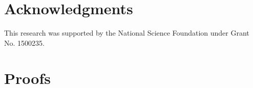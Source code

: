 \draftsecskip



\section*{Acknowledgments}
This research was supported by the National Science 
Foundation under Grant No. 1500235.





\draftsecskip



\appendix
\section{Proofs}
